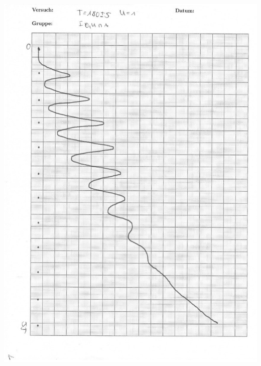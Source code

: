 \vfill\null
\newpage
\null\vfill
\includegraphics[width=0.9\linewidth]{content/messung/anhang/6.jpg}
\vfill\null
